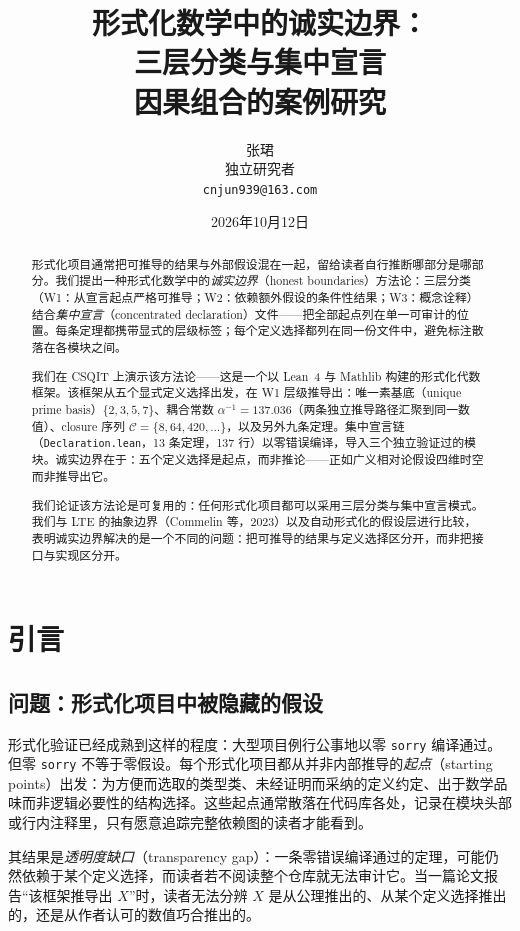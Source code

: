 \documentclass[11pt]{ctexart}
\title{形式化数学中的诚实边界：\\
三层分类与集中宣言\\[4pt]
\large 因果组合的案例研究}
\author{张珺\\
独立研究者\\
\texttt{cnjun939@163.com}}
\date{2026年10月12日}
\begin{document}
\maketitle

\begin{abstract}
形式化项目通常把可推导的结果与外部假设混在一起，留给读者自行推断哪部分是哪部分。我们提出一种形式化数学中的\emph{诚实边界}（honest boundaries）方法论：三层分类（W1：从宣言起点严格可推导；W2：依赖额外假设的条件性结果；W3：概念诠释）结合\emph{集中宣言}（concentrated declaration）文件——把全部起点列在单一可审计的位置。每条定理都携带显式的层级标签；每个定义选择都列在同一份文件中，避免标注散落在各模块之间。

我们在 CSQIT 上演示该方法论——这是一个以 Lean~4 与 Mathlib 构建的形式化代数框架。该框架从五个显式定义选择出发，在 W1 层级推导出：唯一素基底（unique prime basis）$\{2,3,5,7\}$、耦合常数 $\alpha^{-1} = 137.036$（两条独立推导路径汇聚到同一数值）、closure 序列 $\mathcal{C} = \{8, 64, 420, \ldots\}$，以及另外九条定理。集中宣言链（\texttt{Declaration.lean}，13 条定理，137 行）以零错误编译，导入三个独立验证过的模块。诚实边界在于：五个定义选择是起点，而非推论——正如广义相对论假设四维时空而非推导出它。

我们论证该方法论是可复用的：任何形式化项目都可以采用三层分类与集中宣言模式。我们与 LTE 的抽象边界（Commelin 等，2023）以及自动形式化的假设层进行比较，表明诚实边界解决的是一个不同的问题：把可推导的结果与定义选择区分开，而非把接口与实现区分开。
\end{abstract}

\tableofcontents

\section{引言}

\subsection{问题：形式化项目中被隐藏的假设}
形式化验证已经成熟到这样的程度：大型项目例行公事地以零 \texttt{sorry} 编译通过。但零 \texttt{sorry} 不等于零假设。每个形式化项目都从并非内部推导的\emph{起点}（starting points）出发：为方便而选取的类型类、未经证明而采纳的定义约定、出于数学品味而非逻辑必要性的结构选择。这些起点通常散落在代码库各处，记录在模块头部或行内注释里，只有愿意追踪完整依赖图的读者才能看到。

其结果是\emph{透明度缺口}（transparency gap）：一条零错误编译通过的定理，可能仍然依赖于某个定义选择，而读者若不阅读整个仓库就无法审计它。当一篇论文报告“该框架推导出 $X$”时，读者无法分辨 $X$ 是从公理推出的、从某个定义选择推出的，还是从作者认可的数值巧合推出的。
\end{document}
